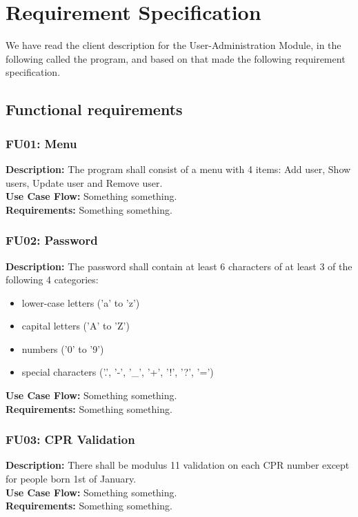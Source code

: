\section{Requirement Specification}
We have read the client description for the User-Administration Module, in the following called the program, and based on that made the following requirement specification.

\subsection*{Functional requirements}
\begin{adjustwidth}{2em}{0pt}
    \subsubsection*{FU01: Menu}
    \begin{adjustwidth}{1em}{0pt}
        \textbf{Description:}
        The program shall consist of a menu with 4 items: Add user, Show users, Update user and Remove user.\\
        \textbf{Use Case Flow:}
        Something something.\\
        \textbf{Requirements:}
        Something something.
    \end{adjustwidth}
    
    \subsubsection*{FU02: Password}
    \begin{adjustwidth}{1em}{0pt}
        \textbf{Description:}
        The password shall contain at least 6 characters of at least 3 of the following 4 categories: 
        \begin{itemize}
            \item lower-case letters ('a' to 'z')
            \item capital letters ('A' to 'Z')
            \item numbers ('0' to '9')
            \item special  characters ('.', '-', '\_', '+', '!', '?', '=')
        \end{itemize}
        \textbf{Use Case Flow:}
        Something something.\\
        \textbf{Requirements:}
        Something something.
    \end{adjustwidth}

    \subsubsection*{FU03: CPR Validation}
    \begin{adjustwidth}{1em}{0pt}
        \textbf{Description:}
        There shall be modulus 11 validation on each CPR number except for people born 1st of January.\\
        \textbf{Use Case Flow:}
        Something something.\\
        \textbf{Requirements:}
        Something something.
    \end{adjustwidth}
    

\end{adjustwidth}
